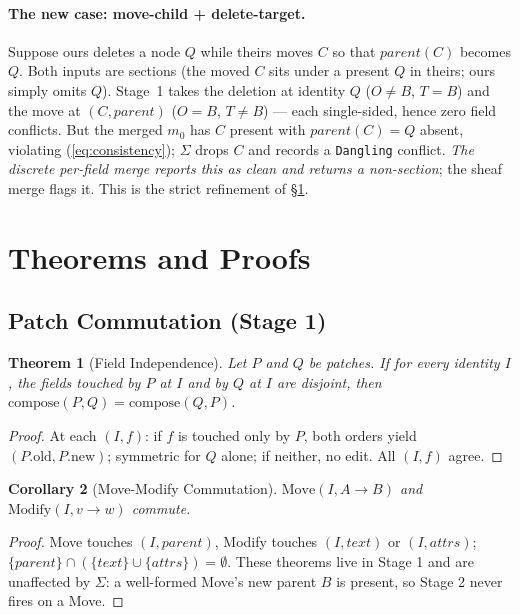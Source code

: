 \documentclass[11pt,a4paper]{article}
\newtheorem{theorem}{Theorem}
\newtheorem{corollary}[theorem]{Corollary}
\begin{document}
\paragraph{The new case: move-child + delete-target.}
Suppose ours deletes a node $Q$ while theirs moves $C$ so that
$parent(C)$ becomes $Q$. Both inputs are sections (the moved $C$ sits under
a present $Q$ in theirs; ours simply omits $Q$). Stage~1 takes the deletion
at identity $Q$ ($O{\neq}B$, $T{=}B$) and the move at $(C,parent)$
($O{=}B$, $T{\neq}B$) --- each single-sided, hence zero field conflicts.
But the merged $m_0$ has $C$ present with $parent(C){=}Q$ absent, violating
(\ref{eq:consistency}); $\Sigma$ drops $C$ and records a \texttt{Dangling}
conflict. \emph{The discrete per-field merge reports this as clean and
returns a non-section}; the sheaf merge flags it. This is the strict
refinement of \S\ref{sec:theory}.


\section{Theorems and Proofs}
\label{sec:theory}

\subsection{Patch Commutation (Stage 1)}

\begin{theorem}[Field Independence]
\label{thm:field}
Let $P$ and $Q$ be patches. If for every identity $I$, the fields touched
by $P$ at $I$ and by $Q$ at $I$ are disjoint, then
$\mathrm{compose}(P, Q) = \mathrm{compose}(Q, P)$.
\end{theorem}

\begin{proof}
At each $(I, f)$: if $f$ is touched only by $P$, both orders yield
$(P.\text{old}, P.\text{new})$; symmetric for $Q$ alone; if neither, no
edit. All $(I,f)$ agree.
\end{proof}

\begin{corollary}[Move-Modify Commutation]
$\mathrm{Move}(I, A{\to}B)$ and $\mathrm{Modify}(I, v{\to}w)$ commute.
\end{corollary}

\begin{proof}
Move touches $(I,parent)$, Modify touches $(I,text)$ or $(I,attrs)$;
$\{parent\} \cap (\{text\} \cup \{attrs\}) = \emptyset$. These theorems
live in Stage 1 and are unaffected by $\Sigma$: a well-formed Move's new
parent $B$ is present, so Stage 2 never fires on a Move.
\end{proof}
\end{document}
